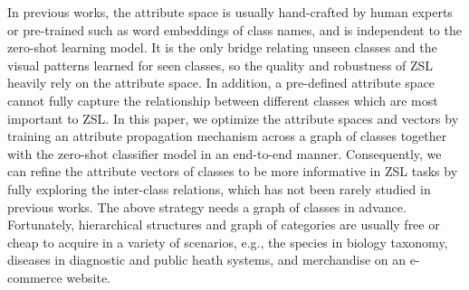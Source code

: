 \documentclass[letterpaper]{article} %
\begin{document}
In previous works, the attribute space is usually hand-crafted by human experts or pre-trained such as word embeddings of class names, and is independent to the zero-shot learning model. It is the only bridge relating unseen classes and the visual patterns learned for seen classes, so the quality and robustness of ZSL heavily rely on the attribute space. In addition, a pre-defined attribute space cannot fully capture the relationship between different classes which are most important to ZSL. 
In this paper, we optimize the attribute spaces and vectors by training an attribute propagation mechanism across a graph of classes together with the zero-shot classifier model in an end-to-end manner. Consequently, we can refine the attribute vectors of classes to be more informative in ZSL tasks by fully exploring the inter-class relations, which has not been rarely studied in previous works.
The above strategy needs a graph of classes in advance. Fortunately, hierarchical structures and graph of categories are usually free or cheap to acquire in a variety of scenarios, e.g., the species in biology taxonomy, diseases in diagnostic and public heath systems, and merchandise on an e-commerce website.
\end{document}
